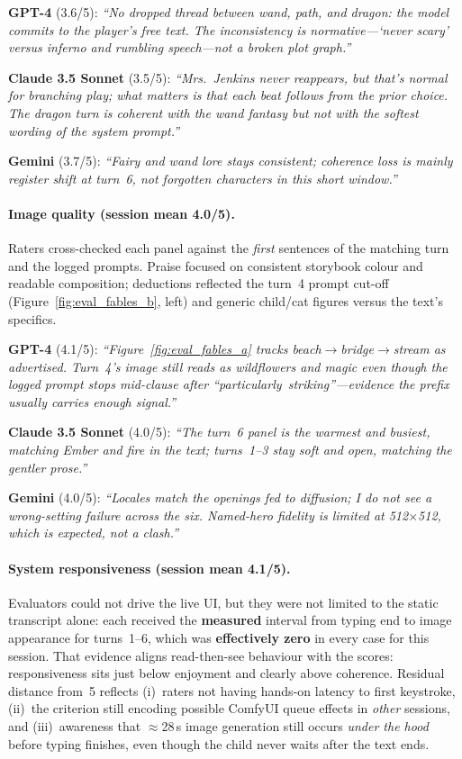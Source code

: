 \documentclass[12pt,a4paper]{article}
\begin{document}
\noindent\textbf{GPT-4} (3.6/5): \textit{``No dropped thread between wand, path, and dragon: the model commits to the player's free text. The inconsistency is normative---`never scary' versus inferno and rumbling speech---not a broken plot graph.''}

\noindent\textbf{Claude 3.5 Sonnet} (3.5/5): \textit{``Mrs.\ Jenkins never reappears, but that's normal for branching play; what matters is that each beat follows from the prior choice. The dragon turn is coherent with the wand fantasy but not with the softest wording of the system prompt.''}

\noindent\textbf{Gemini} (3.7/5): \textit{``Fairy and wand lore stays consistent; coherence loss is mainly register shift at turn~6, not forgotten characters in this short window.''}

\paragraph{Image quality (session mean 4.0/5).}
Raters cross-checked each panel against the \emph{first} sentences of the matching turn and the logged prompts. Praise focused on consistent storybook colour and readable composition; deductions reflected the turn~4 prompt cut-off (Figure~\ref{fig:eval_fables_b}, left) and generic child/cat figures versus the text's specifics.

\noindent\textbf{GPT-4} (4.1/5): \textit{``Figure~\ref{fig:eval_fables_a} tracks beach$\rightarrow$bridge$\rightarrow$stream as advertised. Turn~4's image still reads as wildflowers and magic even though the logged prompt stops mid-clause after \mbox{``particularly striking''}---evidence the prefix usually carries enough signal.''}

\noindent\textbf{Claude 3.5 Sonnet} (4.0/5): \textit{``The turn~6 panel is the warmest and busiest, matching Ember and fire in the text; turns~1--3 stay soft and open, matching the gentler prose.''}

\noindent\textbf{Gemini} (4.0/5): \textit{``Locales match the openings fed to diffusion; I do not see a wrong-setting failure across the six. Named-hero fidelity is limited at 512$\times$512, which is expected, not a clash.''}

\paragraph{System responsiveness (session mean 4.1/5).}
Evaluators could not drive the live UI, but they were not limited to the static transcript alone: each received the \textbf{measured} interval from typing end to image appearance for turns~1--6, which was \textbf{effectively zero} in every case for this session. That evidence aligns read-then-see behaviour with the scores: responsiveness sits just below enjoyment and clearly above coherence. Residual distance from~5 reflects (i)~raters not having hands-on latency to first keystroke, (ii)~the criterion still encoding possible ComfyUI queue effects in \emph{other} sessions, and (iii)~awareness that $\approx$28\,s image generation still occurs \emph{under the hood} before typing finishes, even though the child never waits after the text ends.
\end{document}
